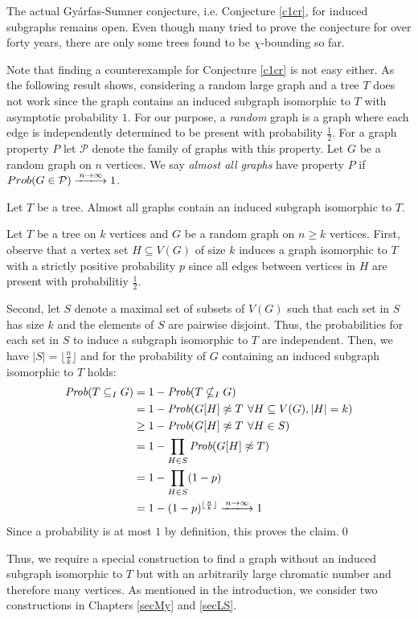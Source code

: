 The actual Gyárfas-Sumner conjecture, i.e. Conjecture \ref{c1cr}, for induced subgraphs remains open. Even though many tried to prove the conjecture for over forty years, there are only some trees found to be $\chi$-bounding so far. 

Note that finding a counterexample for Conjecture \ref{c1cr} is not easy either. As the following result shows, considering a random large graph and a tree $T$ does not work since the graph contains an induced subgraph isomorphic to $T$ with asymptotic probability $1$. For our purpose, a \textit{random} graph is a graph where each edge is independently determined to be present with probability $\frac{1}{2}$. For a graph property $P$ let $\mathcal{P}$ denote the family of graphs with this property. Let $G$ be a random graph on $n$ vertices. We say \textit{almost all graphs} have property $P$ if $Prob(G\in\mathcal{P})\xlongrightarrow{{n\to\infty}} 1$.
\begin{thm}
Let $T$ be a tree. Almost all graphs contain an induced subgraph isomorphic to $T$.
\end{thm}
\begin{prf}
Let $T$ be a tree on $k$ vertices and $G$ be a random graph on $n\geq k$ vertices. First, observe that a vertex set $H\subseteq V(G)$ of size $k$ induces a graph isomorphic to $T$ with a strictly positive probability $p$ since all edges between vertices in $H$ are present with probabilitiy $\frac{1}{2}$. 

Second, let $S$ denote a maximal set of subsets of $V(G)$ such that each set in $S$ has size $k$ and the elements of $S$ are pairwise disjoint. Thus, the probabilities for each set in $S$ to induce a subgraph isomorphic to $T$ are independent. Then, we have $\vert S\vert =\lfloor \frac{n}{k}\rfloor$ and for the probability of $G$ containing an induced subgraph isomorphic to $T$ holds:
\begin{equation*}
\begin{split}
\textit{Prob}(T\subseteq_I G) &= 1-\textit{Prob}(T\nsubseteq_I G)\\
&=1-\textit{Prob}(G[H]\not\approx T \hspace{0.4em}\forall H\subseteq V(G), \vert H\vert =k)\\
&\geq 1-\textit{Prob}(G[H]\not\approx T \hspace{0.4em}\forall H\in S)\\
&=1-\prod_{H\in S}\textit{Prob}(G[H]\not\approx T)\\
&=1-\prod_{H\in S} (1-p)\\
&=1-(1-p)^{\lfloor\frac{n}{k}\rfloor}\xlongrightarrow{{n\to\infty}} 1
\end{split}
\end{equation*}
Since a probability is at most $1$ by definition, this proves the claim.\qed
\end{prf}
Thus, we require a special construction to find a graph without an induced subgraph isomorphic to $T$ but with an arbitrarily large chromatic number and therefore many vertices. As mentioned in the introduction, we consider two constructions in Chapters \ref{secMy} and \ref{secLS}.

